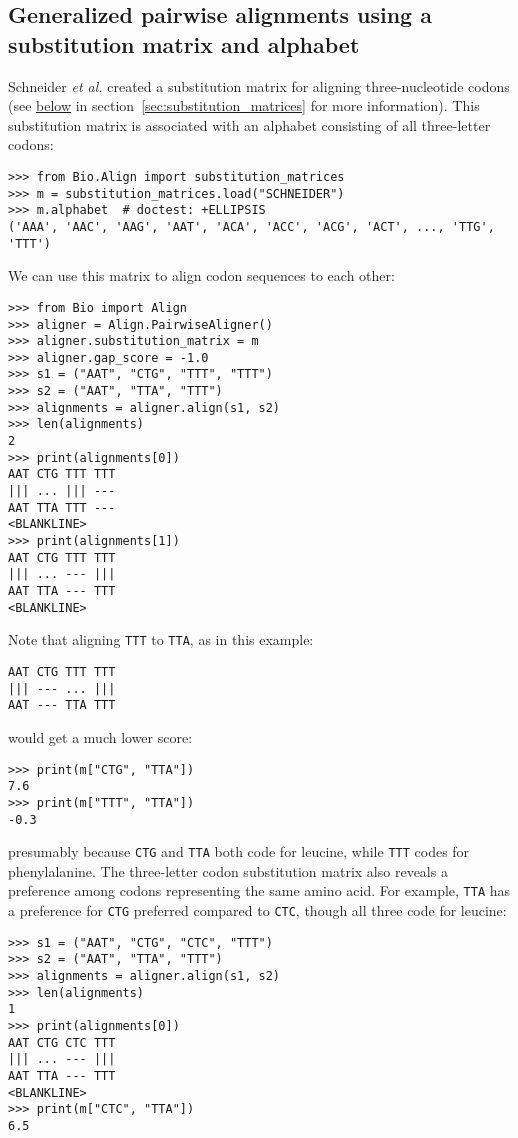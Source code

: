 \subsection{Generalized pairwise alignments using a substitution matrix and alphabet}

Schneider \textit{et al.} \cite{schneider2005} created a substitution matrix for aligning three-nucleotide codons (see \hyperlink{codonmatrix}{below} in section~\ref{sec:substitution_matrices} for more information). This substitution matrix is associated with an alphabet consisting of all three-letter codons:

\begin{verbatim}
>>> from Bio.Align import substitution_matrices
>>> m = substitution_matrices.load("SCHNEIDER")
>>> m.alphabet  # doctest: +ELLIPSIS
('AAA', 'AAC', 'AAG', 'AAT', 'ACA', 'ACC', 'ACG', 'ACT', ..., 'TTG', 'TTT')
\end{verbatim}
We can use this matrix to align codon sequences to each other:

\begin{verbatim}
>>> from Bio import Align
>>> aligner = Align.PairwiseAligner()
>>> aligner.substitution_matrix = m
>>> aligner.gap_score = -1.0
>>> s1 = ("AAT", "CTG", "TTT", "TTT")
>>> s2 = ("AAT", "TTA", "TTT")
>>> alignments = aligner.align(s1, s2)
>>> len(alignments)
2
>>> print(alignments[0])
AAT CTG TTT TTT
||| ... ||| ---
AAT TTA TTT ---
<BLANKLINE>
>>> print(alignments[1])
AAT CTG TTT TTT
||| ... --- |||
AAT TTA --- TTT
<BLANKLINE>
\end{verbatim}
Note that aligning \verb+TTT+ to \verb+TTA+, as in this example:
\begin{verbatim}
AAT CTG TTT TTT
||| --- ... |||
AAT --- TTA TTT
\end{verbatim}
would get a much lower score:

\begin{verbatim}
>>> print(m["CTG", "TTA"])
7.6
>>> print(m["TTT", "TTA"])
-0.3
\end{verbatim}
presumably because \verb+CTG+ and \verb+TTA+ both code for leucine, while \verb+TTT+ codes for phenylalanine. The three-letter codon substitution matrix also reveals a preference among codons representing the same amino acid. For example, \verb+TTA+ has a preference for \verb+CTG+ preferred compared to \verb+CTC+, though all three code for leucine:

\begin{verbatim}
>>> s1 = ("AAT", "CTG", "CTC", "TTT")
>>> s2 = ("AAT", "TTA", "TTT")
>>> alignments = aligner.align(s1, s2)
>>> len(alignments)
1
>>> print(alignments[0])
AAT CTG CTC TTT
||| ... --- |||
AAT TTA --- TTT
<BLANKLINE>
>>> print(m["CTC", "TTA"])
6.5
\end{verbatim}

